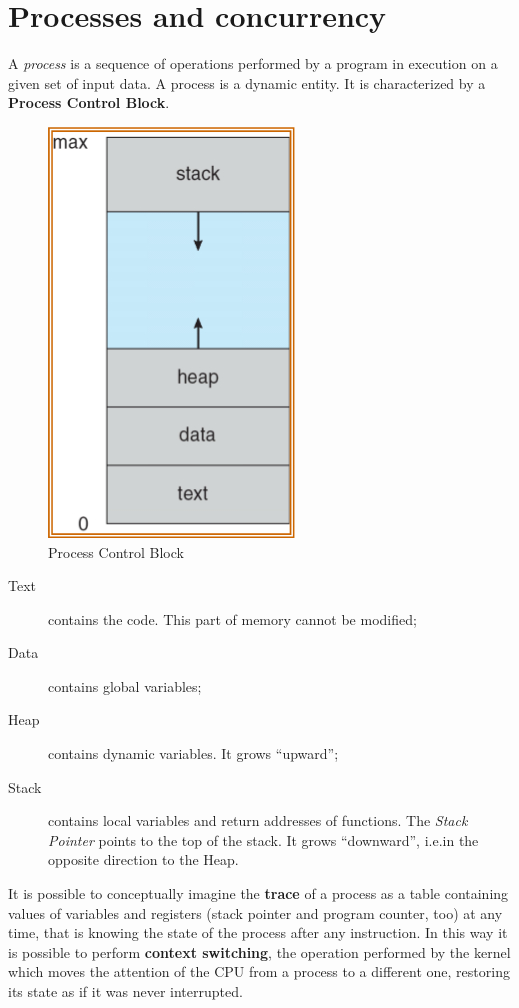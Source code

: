 \chapter{Processes and concurrency}
A \emph{process} is a sequence of operations performed by a program in execution on a given set of input data. A process is a dynamic entity. It is characterized by a \textbf{Process Control Block}.

\begin{figure}[hbtp]
\centering
\includegraphics[scale=0.3]{images/processes_concurrency/pcb.jpg}
\caption{Process Control Block}
\end{figure}
\begin{description}
\item [Text] contains the code. This part of memory cannot be modified;
\item [Data] contains global variables;
\item [Heap] contains dynamic variables. It grows ``upward'';
\item [Stack] contains local variables and return addresses of functions. The \emph{Stack Pointer} points to the top of the stack. It grows ``downward'', i.e.\@ in the opposite direction to the Heap.
\end{description}

It is possible to conceptually imagine the \textbf{trace} of a process as a table containing values of variables and registers (stack pointer and program counter, too) at any time, that is knowing the state of the process after any instruction. In this way it is possible to perform \textbf{context switching}, the operation performed by the kernel which moves the attention of the CPU from a process to a different one, restoring its state as if it was never interrupted.

